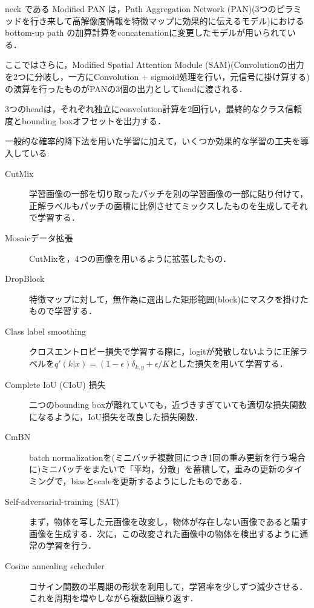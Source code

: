 \documentclass[originalpaper,fleqn]{jsaiart}     %
\begin{document}
neck である Modified PAN は，Path Aggregation Network (PAN)(3つのピラミッドを行き来して高解像度情報を特徴マップに効果的に伝えるモデル)におけるbottom-up path の加算計算をconcatenationに変更したモデルが用いられている．

ここではさらに，Modified Spatial Attention Module (SAM)(Convolutionの出力を2つに分岐し，一方にConvolution + sigmoid処理を行い，元信号に掛け算する)の演算を行ったものがPANの3個の出力としてheadに渡される．

3つのheadは，それぞれ独立にconvolution計算を2回行い，最終的なクラス信頼度とbounding boxオフセットを出力する．

一般的な確率的降下法を用いた学習に加えて，いくつか効果的な学習の工夫を導入している: 

\begin{description}
    \item[CutMix] 学習画像の一部を切り取ったパッチを別の学習画像の一部に貼り付けて，正解ラベルもパッチの面積に比例させてミックスしたものを生成してそれで学習する．
    \item[Mosaicデータ拡張] CutMixを，4つの画像を用いるように拡張したもの．
    \item[DropBlock] 特徴マップに対して，無作為に選出した矩形範囲(block)にマスクを掛けたもので学習する．
    \item[Class label smoothing] クロスエントロピー損失で学習する際に，logitが発散しないように正解ラベルを$q'(k|x)=(1-\epsilon)\delta_{k,y}+\epsilon/K$とした損失を用いて学習する．
    \item[Complete IoU (CIoU) 損失] 二つのbounding boxが離れていても，近づきすぎていても適切な損失関数になるように，IoU損失を改良した損失関数．
    \item[CmBN] batch normalizationを(ミニバッチ複数回につき1回の重み更新を行う場合に)ミニバッチをまたいで「平均，分散」を蓄積して，重みの更新のタイミングで，biasとscaleを更新するようにしたものである．
    \item[Self-adversarial-training (SAT)] まず，物体を写した元画像を改変し，物体が存在しない画像であると騙す画像を生成する．次に，この改変された画像中の物体を検出するように通常の学習を行う．
    \item[Cosine annealing scheduler] コサイン関数の半周期の形状を利用して，学習率を少しずつ減少させる．これを周期を増やしながら複数回繰り返す．
\end{description}
\end{document}

